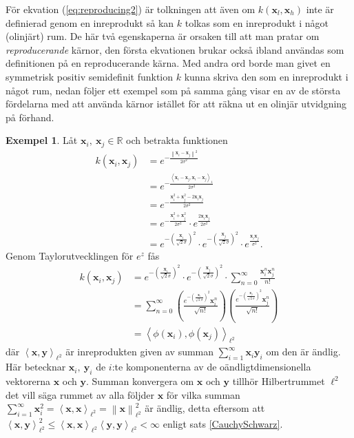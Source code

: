 \documentclass[a4paper, 12pt]{report}
\theoremstyle{definition}
\newtheorem{ex}{Exempel}[section]
\theoremstyle{remark}
\newcommand{\bfx}{\mathbf{x}}
\newcommand{\bfy}{\mathbf{y}}
\newcommand{\llangle}{\left\langle}
\newcommand{\rrangle}{\right\rangle}
\newcommand{\inner}[2]{\llangle #1, #2 \rrangle}
\begin{document}
För ekvation (\ref{eq:reproducing2}) är tolkningen att även om $k\left(\bfx_l, \bfx_h\right)$ inte är definierad genom en inreprodukt så kan $k$ tolkas som en inreprodukt i något (olinjärt) rum. De här två egenskaperna är orsaken till att man pratar om \emph{reproducerande} kärnor, den första ekvationen brukar också ibland användas som definitionen på en reproducerande kärna. Med andra ord borde man givet en symmetrisk positiv semidefinit funktion $k$ kunna skriva den som en inreprodukt i något rum, nedan följer ett exempel som på samma gång visar en av de största fördelarna med att använda kärnor istället för att räkna ut en olinjär utvidgning på förhand.

\begin{ex}
	Låt $\bfx_i,~\bfx_j\in\mathbb{R}$ och betrakta funktionen
	\begin{align*}
		k\left(\bfx_i, \bfx_j\right)&=e^{-\frac{\left\| \bfx_i-\bfx_j\right\|^2}{2\sigma^2}}\\&=e^{-\frac{\inner{\bfx_i-\bfx_j}{\bfx_i-\bfx_j}_1}{2\sigma^2}}\\
		&=e^{-\frac{\bfx_i^2+\bfx_j^2-2\bfx_i\bfx_j}{2\sigma^2}}\\&=e^{-\frac{\bfx_i^2+\bfx_j^2}{2\sigma^2}}\cdot e^{\frac{2\bfx_i\bfx_j}{2\sigma^2}}\\
		&= e^{-\left(\frac{\bfx_i}{\sqrt{2}\sigma}\right)^2}\cdot e^{-\left(\frac{\bfx_j}{\sqrt{2}\sigma}\right)^2}\cdot e^{\frac{\bfx_i\bfx_j}{\sigma^2}}.
	\end{align*}
	Genom Taylorutvecklingen för $e^{z}$ fås
	\begin{align*}
		k\left(\bfx_i, \bfx_j\right)&= e^{-\left(\frac{\bfx_i}{\sqrt{2}\sigma}\right)^2}\cdot e^{-\left(\frac{\bfx_j}{\sqrt{2}\sigma}\right)^2}\cdot \sum_{n=0}^{\infty}\frac{\bfx_i^n\bfx_j^n}{n!}\\
		&= \sum_{n=0}^{\infty} \left(\frac{e^{-\left(\frac{\bfx_i}{\sqrt{2}\sigma}\right)^2} \bfx_i^n}{\sqrt{n!}}\right)\left(\frac{e^{-\left(\frac{\bfx_j}{\sqrt{2}\sigma}\right)^2} \bfx_j^n}{\sqrt{n!}}\right)\\
		&= \inner{\phi\left(\bfx_i\right)}{\phi\left(\bfx_j\right)}_{\ell^2}
	\end{align*}
	där $\inner{\bfx}{\bfy}_{\ell^2}$ är inreprodukten given av summan $\sum_{i=1}^{\infty}\bfx_i\bfy_i$ om den är ändlig. Här betecknar $\bfx_i,~\bfy_i$ de $i$:te komponenterna av de oändligtdimensionella vektorerna $\bfx$ och $\bfy$. Summan konvergera om $\bfx$ och $\bfy$ tillhör Hilbertrummet $\ell^2$ det vill säga rummet av alla följder $\bfx$ för vilka summan $\sum_{i=1}^{\infty}\bfx_i^2=\inner{\bfx}{\bfx}_{\ell^2}=\left\|\bfx\right\|_{\ell^2}^2$ är ändlig, detta eftersom att $\inner{\bfx}{\bfy}_{\ell^2}^2\leq\inner{\bfx}{\bfx}_{\ell^2}\inner{\bfy}{\bfy}_{\ell^2}<\infty$ enligt sats \ref{CauchySchwarz}.
	

\end{ex}
\end{document}
